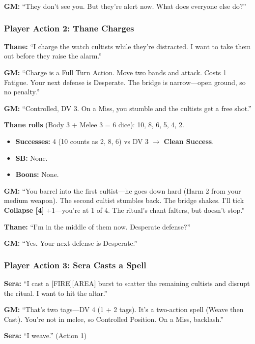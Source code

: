 \textbf{GM:} ``They don't see you. But they're alert now. What does everyone else do?''

\subsubsection{Player Action 2: Thane Charges}

\textbf{Thane:} ``I charge the watch cultists while they're distracted. I want to take them out before they raise the alarm.''

\textbf{GM:} ``Charge is a Full Turn Action. Move two bands and attack. Costs 1 Fatigue. Your next defense is Desperate. The bridge is narrow---open ground, so no penalty.''

\textbf{GM:} ``Controlled, DV 3. On a Miss, you stumble and the cultists get a free shot.''

\textbf{Thane rolls} (Body 3 + Melee 3 = 6 dice): 10, 8, 6, 5, 4, 2.

\begin{itemize}
  \item \textbf{Successes:} 4 (10 counts as 2, 8, 6) vs DV 3 $\rightarrow$ \textbf{Clean Success}.
  \item \textbf{SB:} None.
  \item \textbf{Boons:} None.
\end{itemize}

\textbf{GM:} ``You barrel into the first cultist---he goes down hard (Harm 2 from your medium weapon). The second cultist stumbles back. The bridge shakes. I'll tick \textbf{Collapse [4]} +1---you're at 1 of 4. The ritual's chant falters, but doesn't stop.''

\textbf{Thane:} ``I'm in the middle of them now. Desperate defense?''

\textbf{GM:} ``Yes. Your next defense is Desperate.''

\subsubsection{Player Action 3: Sera Casts a Spell}

\textbf{Sera:} ``I cast a [FIRE][AREA] burst to scatter the remaining cultists and disrupt the ritual. I want to hit the altar.''

\textbf{GM:} ``That's two tags---DV 4 (1 + 2 tags). It's a two-action spell (Weave then Cast). You're not in melee, so Controlled Position. On a Miss, backlash.''

\textbf{Sera:} ``I weave.'' (Action 1)

